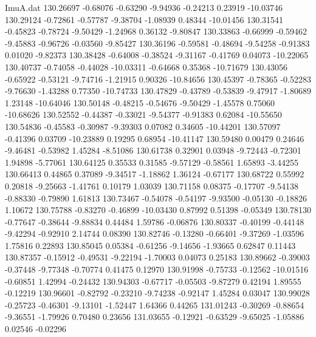 \begin{filecontents}{ImuA.dat}
 130.26697   -0.68076   -0.63290   -9.94936   -0.24213    0.23919  -10.03746
 130.29124   -0.72861   -0.57787   -9.38704   -1.08939    0.48344  -10.01456
 130.31541   -0.45823   -0.78724   -9.50429   -1.24968    0.36132   -9.80847
 130.33863   -0.66999   -0.59462   -9.45883   -0.96726   -0.03560   -9.85427
 130.36196   -0.59581   -0.48694   -9.54258   -0.91383    0.01020   -9.82373
 130.38428   -0.64008   -0.38524   -9.31167   -0.41769    0.04073  -10.22065
 130.40737   -0.74058   -0.44028  -10.03311   -0.64668    0.35368  -10.71679
 130.43056   -0.65922   -0.53121   -9.74716   -1.21915    0.90326  -10.84656
 130.45397   -0.78365   -0.52283   -9.76630   -1.43288    0.77350  -10.74733
 130.47829   -0.43789   -0.53839   -9.47917   -1.80689    1.23148  -10.64046
 130.50148   -0.48215   -0.54676   -9.50429   -1.45578    0.75060  -10.68626
 130.52552   -0.44387   -0.33021   -9.54377   -0.91383    0.62084  -10.55650
 130.54836   -0.45583   -0.30987   -9.39303    0.07082    0.34605  -10.44201
 130.57097   -0.41396    0.03709  -10.23889    0.19295    0.68954  -10.41147
 130.59480    0.00479    0.24646   -9.46481   -0.53982    1.45284   -8.51086
 130.61738    0.32901    0.03948   -9.72443   -0.72301    1.94898   -5.77061
 130.64125    0.35533    0.31585   -9.57129   -0.58561    1.65893   -3.44255
 130.66413    0.44865    0.37089   -9.34517   -1.18862    1.36124   -0.67177
 130.68722    0.55992    0.20818   -9.25663   -1.41761    0.10179    1.03039
 130.71158    0.08375   -0.17707   -9.54138   -0.88330   -0.79890    1.61813
 130.73467   -0.54078   -0.54197   -9.93500   -0.05130   -0.18826    1.10672
 130.75788   -0.83270   -0.46899  -10.03430    0.87992    0.51398   -0.05349
 130.78130   -0.77647   -0.38644   -9.88834    0.44484    1.59786   -0.06876
 130.80337   -0.40199   -0.44148   -9.42294   -0.92910    2.14744    0.08390
 130.82746   -0.13280   -0.66401   -9.37269   -1.03596    1.75816    0.22893
 130.85045    0.05384   -0.61256   -9.14656   -1.93665    0.62847    0.11443
 130.87357   -0.15912   -0.49531   -9.22194   -1.70003    0.04073    0.25183
 130.89662   -0.39003   -0.37448   -9.77348   -0.70774    0.41475    0.12970
 130.91998   -0.75733   -0.12562  -10.01516   -0.60851    1.42994   -0.24432
 130.94303   -0.67717   -0.05503   -9.87279    0.42194    1.89555   -0.12219
 130.96601   -0.82792   -0.23210   -9.74238   -0.92147    1.45284    0.03047
 130.99028   -0.25723   -0.46301   -9.13101   -1.52447    1.64366    0.44265
 131.01243   -0.30269   -0.88654   -9.36551   -1.79926    0.70480    0.23656
 131.03655   -0.12921   -0.63529   -9.65025   -1.05886    0.02546   -0.02296

\end{filecontents}
